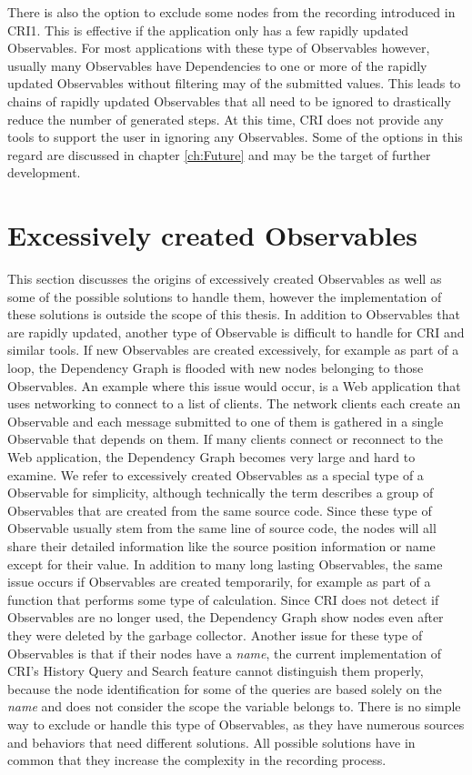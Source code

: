 There is also the option to exclude some nodes from the recording introduced in CRI1. This is effective if the application only has a few rapidly updated Observables. For most applications with these type of Observables however, usually many Observables have Dependencies to one or more of the rapidly updated Observables without filtering may of the submitted values. This leads to chains of rapidly updated Observables that all need to be ignored to drastically reduce the number of generated steps. At this time, CRI does not provide any tools to support the user in ignoring any Observables. Some of the options in this regard are discussed in chapter \ref{ch:Future} and may be the target of further development.

\section{Excessively created Observables}
\label{sec:DynamicallyCreated}
This section discusses the origins of excessively created Observables as well as some of the possible solutions to handle them, however the implementation of these solutions is outside the scope of this thesis.
In addition to Observables that are rapidly updated, another type of Observable is difficult to handle for CRI and similar tools. If new Observables are created excessively, for example as part of a loop, the Dependency Graph is flooded with new nodes belonging to those Observables. An example where this issue would occur, is a Web application that uses networking to connect to a list of clients. The network clients each create an Observable and each message submitted to one of them is gathered in a single Observable that depends on them. If many clients connect or reconnect to the Web application, the Dependency Graph becomes very large and hard to examine. We refer to excessively created Observables as a special type of a Observable for simplicity, although technically the term describes a group of Observables that are created from the same source code. Since these type of Observable usually stem from the same line of source code, the nodes will all share their detailed information like the source position information or name except for their value. In addition to many long lasting Observables, the same issue occurs if Observables are created temporarily, for example as part of a function that performs some type of calculation. Since CRI does not detect if Observables are no longer used, the Dependency Graph show nodes even after they were deleted by the garbage collector. Another issue for these type of Observables is that if their nodes have a \emph{name}, the current implementation of CRI's History Query and Search feature cannot distinguish them properly, because the node identification for some of the queries are based solely on the \emph{name} and does not consider the scope the variable belongs to.
There is no simple way to exclude or handle this type of Observables, as they have numerous sources and behaviors that need different solutions. All possible solutions have in common that they increase the complexity in the recording process.

